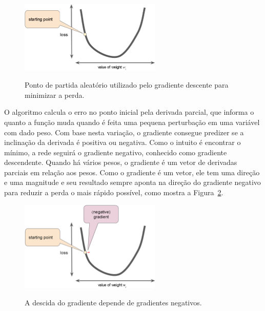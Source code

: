             \begin{figure}[H]
                \centering
                \caption{Ponto de partida aleatório utilizado pelo gradiente descente para minimizar a perda.}
                \includegraphics[width=0.6\textwidth]{fig/2-fundamentacao/aprendizado/gradiente_descendente_ponto_inicial.png}
                \label{fig:gradiente_descendente_ponto_inicial}
            \end{figure}
            
            O algoritmo calcula o erro no ponto inicial pela derivada parcial, que informa o quanto a função muda quando é feita uma pequena perturbação em uma variável com dado peso. Com base nesta variação, o gradiente consegue predizer se a inclinação da derivada é positiva ou negativa. Como o intuito é encontrar o mínimo, a rede seguirá o gradiente negativo, conhecido como gradiente descendente. Quando há vários pesos, o gradiente é um vetor de derivadas parciais em relação aos pesos. Como o gradiente é um vetor, ele tem uma direção e uma magnitude e seu resultado sempre aponta na direção do gradiente negativo para reduzir a perda o mais rápido possível, como mostra a Figura~\ref{fig:vetor_direcao_gradiente}. 
    
            \begin{figure}[H]
                \centering
                \caption{A descida do gradiente depende de gradientes negativos.}
                \includegraphics[width=0.6\textwidth]{fig/2-fundamentacao/aprendizado/vetor_direcao_gradiente.png}
                \label{fig:vetor_direcao_gradiente}
            \end{figure}
            
